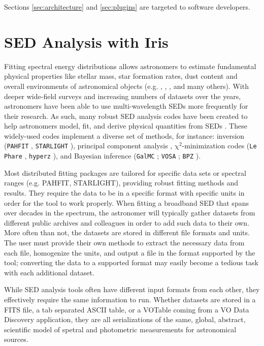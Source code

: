 \documentclass[5p]{elsarticle}
\begin{document}
Sections \ref{sec:architecture} and \ref{sec:plugins} are targeted to software developers.

\section{SED Analysis with Iris}
\label{sec:overview}

Fitting spectral energy distributions allows astronomers to estimate fundamental physical properties like stellar mass, star formation rates, dust content and overall environments of astronomical objects (e.g. \citep{1998AJ....115.1329S}, \citep{2001ApJS..137..139S}, \citep{2007ApJS..169..328R}, and many others). With deeper wide-field surveys and increasing numbers of datasets over the years, astronomers have been able to use multi-wavelength SEDs more frequently for their research. As such, many robust SED analysis codes have been created to help astronomers model, fit, and derive physical quantities from SEDs \citep{2011Ap&SS.331....1W,2013ARA&A..51..393C}. These widely-used codes implement a diverse set of methods, for instance: inversion (\texttt{PAHFIT} \citep{2007ApJ...656..770S}, \texttt{STARLIGHT} \cite{2004MNRAS.355..273C}), principal component analysis \citep{2009MNRAS.394.1496B}, $\mathrm{\chi}^{2}$-minimization codes (\texttt{Le Phare} \citep{1999MNRAS.310..540A}, \texttt{hyperz} \citep{2000A&A...363..476B}), and Bayesian inference (\texttt{GalMC} \citep{2011ApJ...737...47A}; \texttt{VOSA} \citep{2008A&A...492..277B}; \texttt{BPZ} \citep{2000ApJ...536..571B}).

Most distributed fitting packages are tailored for specific data sets or spectral ranges (e.g. PAHFIT, STARLIGHT), providing robust fitting methods and results. They require the data to be in a specific format with specific units in order for the tool to work properly. When fitting a broadband SED that spans over decades in the spectrum, the astronomer will typically gather datasets from different public archives and colleagues in order to add such data to their own. More often than not, the datasets are stored in different file formats and units. 
The user must provide their own methods to extract the necessary data from each file, homogenize the units, and output a file in the format supported by the tool; converting the data to a supported format may easily become a tedious task with each additional dataset.

While SED analysis tools often have different input formats from each other, they effectively require the same information to run. Whether datasets are stored in a FITS file, a tab separated ASCII table, or a VOTable coming from a VO Data Discovery application, they are all serializations of the same, global, abstract, scientific model of spetral and photometric measurements for astronomical sources.
\end{document}
